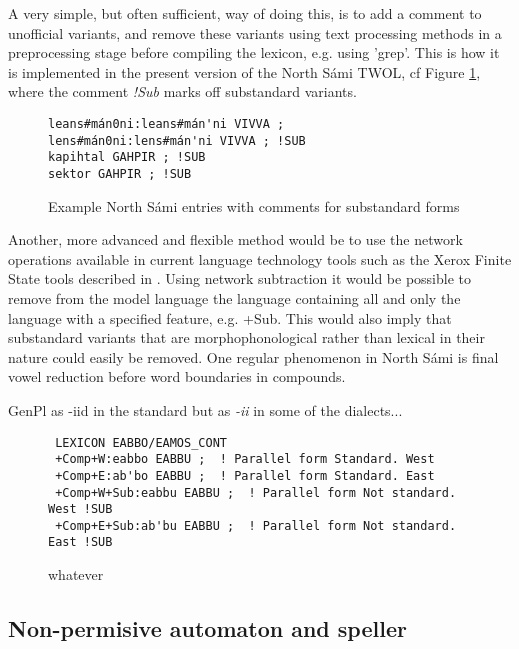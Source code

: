 \documentclass[a4paper,english]{article}
\begin{document}
A very simple, but often sufficient, way of doing this, is to add a comment to unofficial variants, and remove these variants using text processing methods in a preprocessing stage before compiling the lexicon, e.g. using 'grep'. This is how it is implemented in the present version of the North Sámi TWOL, cf Figure \ref{sublex}, where the comment \textit{!Sub} marks off substandard variants.

\begin{figure}[htbp]
\begin{center}
\begin{verbatim}
leans#mán0ni:leans#mán'ni VIVVA ;
lens#mán0ni:lens#mán'ni VIVVA ; !SUB
kapihtal GAHPIR ; !SUB
sektor GAHPIR ; !SUB
\end{verbatim}
\caption{Example North Sámi entries with comments for substandard forms}
\label{sublex}
\end{center}
\end{figure}


Another, more advanced and flexible method would be to use the network operations available in current language technology tools such as the Xerox Finite State tools described in \cite{Beesley03}. Using network subtraction it would be possible to remove from the model language the language containing all and only the language with a specified feature, e.g. +Sub. This would also imply that substandard variants that are morphophonological rather than lexical in their nature could easily be removed. One regular phenomenon in North Sámi is final vowel reduction before word boundaries in compounds.


GenPl as -iid in the standard but as \textit{-ii}
 in some of the dialects...

\begin{figure}[htbp]
\caption{whatever}
\begin{center}
\begin{verbatim}
 LEXICON EABBO/EAMOS_CONT
 +Comp+W:eabbo EABBU ;  ! Parallel form Standard. West
 +Comp+E:ab'bo EABBU ;  ! Parallel form Standard. East
 +Comp+W+Sub:eabbu EABBU ;  ! Parallel form Not standard. West !SUB
 +Comp+E+Sub:ab'bu EABBU ;  ! Parallel form Not standard. East !SUB
\end{verbatim}
\label{EWadjcomp}
\end{center}
\end{figure}

\subsection{Non-permisive automaton and speller}
\end{document}
